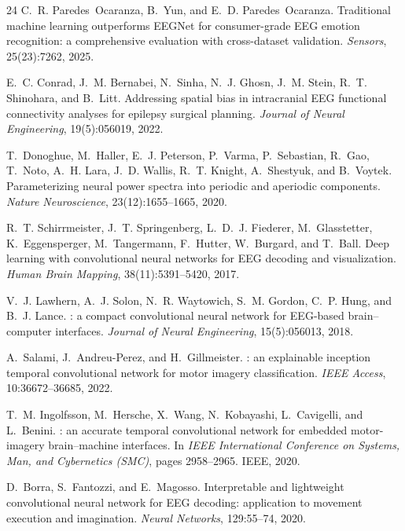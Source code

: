 \documentclass[11pt,a4paper]{article}
\begin{document}
\begin{thebibliography}{24}
C.~R. Paredes~Ocaranza, B.~Yun, and E.~D. Paredes~Ocaranza.
\newblock Traditional machine learning outperforms {EEGNet} for consumer-grade
  {EEG} emotion recognition: a comprehensive evaluation with cross-dataset
  validation.
\newblock \emph{Sensors}, 25(23):7262, 2025.

E.~C. Conrad, J.~M. Bernabei, N.~Sinha, N.~J. Ghosn, J.~M. Stein, R.~T.
  Shinohara, and B.~Litt.
\newblock Addressing spatial bias in intracranial {EEG} functional connectivity
  analyses for epilepsy surgical planning.
\newblock \emph{Journal of Neural Engineering}, 19(5):056019, 2022.

T.~Donoghue, M.~Haller, E.~J. Peterson, P.~Varma, P.~Sebastian, R.~Gao,
  T.~Noto, A.~H. Lara, J.~D. Wallis, R.~T. Knight, A.~Shestyuk, and B.~Voytek.
\newblock Parameterizing neural power spectra into periodic and aperiodic
  components.
\newblock \emph{Nature Neuroscience}, 23(12):1655--1665, 2020.

R.~T. Schirrmeister, J.~T. Springenberg, L.~D.~J. Fiederer, M.~Glasstetter,
  K.~Eggensperger, M.~Tangermann, F.~Hutter, W.~Burgard, and T.~Ball.
\newblock Deep learning with convolutional neural networks for {EEG} decoding
  and visualization.
\newblock \emph{Human Brain Mapping}, 38(11):5391--5420, 2017.

V.~J. Lawhern, A.~J. Solon, N.~R. Waytowich, S.~M. Gordon, C.~P. Hung, and
  B.~J. Lance.
: a compact convolutional neural network for {EEG}-based
  brain--computer interfaces.
\newblock \emph{Journal of Neural Engineering}, 15(5):056013, 2018.

A.~Salami, J.~Andreu-Perez, and H.~Gillmeister.
: an explainable inception temporal convolutional network
  for motor imagery classification.
\newblock \emph{IEEE Access}, 10:36672--36685, 2022.

T.~M. Ingolfsson, M.~Hersche, X.~Wang, N.~Kobayashi, L.~Cavigelli, and
  L.~Benini.
: an accurate temporal convolutional network for embedded
  motor-imagery brain--machine interfaces.
\newblock In \emph{IEEE International Conference on Systems, Man, and
  Cybernetics (SMC)}, pages 2958--2965. IEEE, 2020.

D.~Borra, S.~Fantozzi, and E.~Magosso.
\newblock Interpretable and lightweight convolutional neural network for {EEG}
  decoding: application to movement execution and imagination.
\newblock \emph{Neural Networks}, 129:55--74, 2020.


\end{thebibliography}
\end{document}
